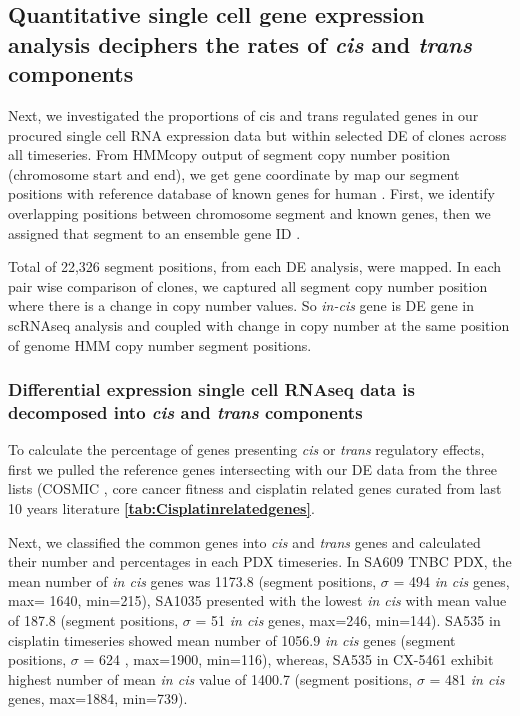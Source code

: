 \subsection{Quantitative single cell gene expression analysis deciphers the rates of \textit{cis} and \textit{trans} components}
Next, we investigated the proportions of cis and trans regulated genes in our procured single cell RNA expression data but within selected \ac{DE} of clones across all timeseries. From HMMcopy output of segment copy number position (chromosome start and end), we get gene coordinate by map our segment positions with reference database of known genes for human  \cite{carlson2015txdb}. First, we identify overlapping positions between chromosome segment and known genes, then we assigned that segment to an ensemble gene ID \cite{rainer2019ensembldb}.

Total of 22,326 segment positions, from each DE analysis, were mapped. In each pair wise comparison of clones, we captured all segment copy number position where there is a change in copy number values. So \textit{in-cis} gene is DE gene in scRNAseq analysis and coupled with change in copy number at the same position of genome HMM copy number segment positions.


\subsubsection{Differential expression single cell RNAseq data is decomposed into \textit{cis} and \textit{trans} components}
To calculate the percentage of genes presenting  \textit{cis} or \textit{trans} regulatory effects, first we pulled the reference genes  intersecting with our \ac{DE} data from the three lists (COSMIC \cite{vogelstein2013cancer}, core cancer fitness \cite{behan2019prioritization} and cisplatin related genes curated from last 10 years literature \textbf{\autoref{tab:Cisplatinrelatedgenes}}.

Next, we classified the common genes into  \textit{cis}  and \textit{trans} genes and calculated their number and percentages in each PDX timeseries. In  SA609 TNBC PDX, the mean number of \textit{in cis} genes was 1173.8 (segment positions, $\sigma$ = 494 \textit{in cis} genes, max= 1640, min=215), SA1035 presented with the lowest \textit{in cis} with
 mean value of 187.8 (segment positions, $\sigma$ = 51 \textit{in cis} genes, max=246, min=144). SA535 in cisplatin timeseries showed mean number of 1056.9 \textit{in cis} genes (segment positions, $\sigma$ = 624 , max=1900, min=116), whereas, SA535 in CX-5461 exhibit highest number of mean \textit{in cis} value of 1400.7 (segment positions, $\sigma$ = 481 \textit{in cis} genes, max=1884, min=739).
 
